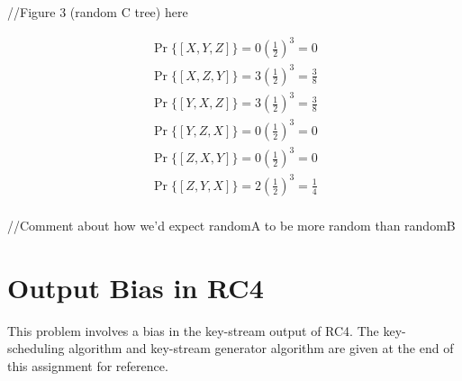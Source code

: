 \documentclass[12pt, letterpaper]{article}
\begin{document}
//Figure 3 (random C tree) here

{\small
\begin{align*}
\Pr\{ [X,Y,Z] \} = 0\left(\frac{1}{2} \right)^3 = 0 \\
\Pr\{ [X,Z,Y] \} = 3\left(\frac{1}{2} \right)^3 = \frac{3}{8} \\
\Pr\{ [Y,X,Z] \} = 3\left(\frac{1}{2} \right)^3 = \frac{3}{8} \\
\Pr\{ [Y,Z,X] \} = 0\left(\frac{1}{2} \right)^3 = 0 \\
\Pr\{ [Z,X,Y] \} = 0\left(\frac{1}{2} \right)^3 = 0\\
\Pr\{ [Z,Y,X] \} = 2\left(\frac{1}{2} \right)^3 = \frac{1}{4} \\
\end{align*}
}

//Comment about how we'd expect randomA to be more random than randomB

\clearpage
\section{Output Bias in RC4}
This problem involves a bias in the key-stream output of RC4.  
The key-scheduling algorithm and key-stream generator algorithm are given at the end of this assignment for reference. 
\end{document}
